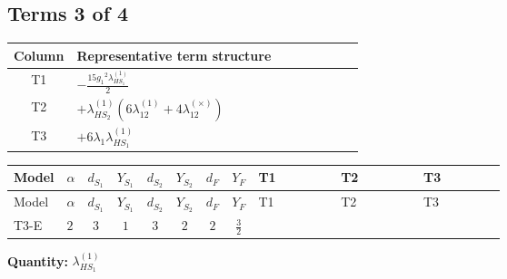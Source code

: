 \documentclass[8pt]{article}
\begin{document}
\begin{landscape}
\subsection*{Terms 3 of 4}
\begin{center}
\begin{tabular}{@{}c >{\raggedright\arraybackslash}p{0.82\linewidth}@{}}
\toprule
Column & Representative term structure \\
\midrule
T1 & \(\displaystyle -\frac{15 {g_1}^2 {\lambda_{HS_1}^{(1)}}}{2}\) \\
\midrule
T2 & \(\displaystyle +{\lambda_{HS_2}^{(1)}} (6 {\lambda_{12}^{(1)}}+4 {\lambda_{12}^{(\times)}})\) \\
\midrule
T3 & \(\displaystyle +6 {\lambda_1} {\lambda_{HS_1}^{(1)}}\) \\
\midrule
\bottomrule
\end{tabular}
\end{center}
\smallskip
\tiny
\begin{longtable}{@{}llcccccc >{\raggedright\arraybackslash}p{0.21\linewidth} >{\raggedright\arraybackslash}p{0.21\linewidth} >{\raggedright\arraybackslash}p{0.21\linewidth}@{}}
\toprule
Model & $\alpha$ & $d_{S_1}$ & $Y_{S_1}$ & $d_{S_2}$ & $Y_{S_2}$ & $d_F$ & $Y_F$ & T1 & T2 & T3 \\
\midrule
\endfirsthead
\toprule
Model & $\alpha$ & $d_{S_1}$ & $Y_{S_1}$ & $d_{S_2}$ & $Y_{S_2}$ & $d_F$ & $Y_F$ & T1 & T2 & T3 \\
\midrule
\endhead
T3-E & $2$ & $3$ & $1$ & $3$ & $2$ & $2$ & $\frac{3}{2}$ & \scriptsize\adjustbox{max width=\linewidth}{$\begin{gathered} -\frac{15 {g_1}^2 {\lambda_{HS_1}^{(1)}}}{2}\end{gathered}$} & \scriptsize\adjustbox{max width=\linewidth}{$\begin{gathered} +{\lambda_{HS_2}^{(1)}} (6 {\lambda_{12}^{(1)}}+4 {\lambda_{12}^{(\times)}})\end{gathered}$} & \scriptsize\adjustbox{max width=\linewidth}{$\begin{gathered} +6 {\lambda_1} {\lambda_{HS_1}^{(1)}}\end{gathered}$} \\
\midrule
\bottomrule
\end{longtable}
\clearpage
\noindent\textbf{Quantity: }$\lambda_{HS_1}^{(1)}$\par\smallskip

\end{landscape}
\end{document}
